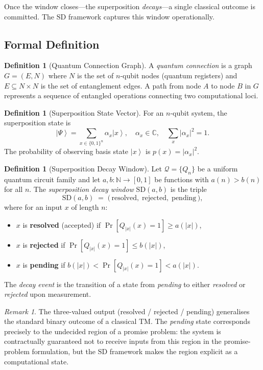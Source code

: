 \documentclass[12pt, a4paper]{article}
\theoremstyle{plain}
\theoremstyle{definition}
\newtheorem{definition}[theorem]{Definition}
\theoremstyle{remark}
\newtheorem{remark}[theorem]{Remark}
\newcommand{\ket}[1]{\left| #1 \right\rangle}
\newcommand{\SD}{\ensuremath{\mathrm{SD}}}   %
\newcommand{\QC}{\ensuremath{\mathcal{Q}}}   %
\newcommand{\Nat}{\mathbb{N}}
\newcommand{\Complex}{\mathbb{C}}
\begin{document}
Once the window closes---the superposition \emph{decays}---a single classical
outcome is committed.  The \SD{} framework captures this window operationally.

\subsection{Formal Definition}

\begin{definition}[Quantum Connection Graph]
  A \emph{quantum connection} is a graph $G = (E, N)$ where $N$ is the set
  of $n$-qubit nodes (quantum registers) and $E \subseteq N \times N$ is the
  set of entanglement edges.  A path from node $A$ to node $B$ in $G$
  represents a sequence of entangled operations connecting two computational
  loci.
\end{definition}

\begin{definition}[Superposition State Vector]
  For an $n$-qubit system, the superposition state is
  \[
    \ket{\Psi} = \sum_{x \in \{0,1\}^n} \alpha_x \ket{x},
    \quad \alpha_x \in \Complex, \quad \sum_{x} |\alpha_x|^2 = 1.
  \]
  The probability of observing basis state $\ket{x}$ is $p(x) = |\alpha_x|^2$.
\end{definition}

\begin{definition}[Superposition Decay Window]
  \label{def:sdwindow}
  Let $\QC = \{Q_n\}$ be a uniform quantum circuit family and let
  $a, b : \Nat \to [0,1]$ be functions with $a(n) > b(n)$ for all $n$.
  The \emph{superposition decay window} $\SD(a, b)$ is the triple
  \[
    \SD(a, b) \;=\; \bigl(\, \text{resolved},\; \text{rejected},\; \text{pending} \,\bigr),
  \]
  where for an input $x$ of length $n$:
  \begin{itemize}
    \item $x$ is \textbf{resolved} (accepted) if $\Pr[Q_{|x|}(x) = 1] \geq a(|x|)$,
    \item $x$ is \textbf{rejected} if $\Pr[Q_{|x|}(x) = 1] \leq b(|x|)$,
    \item $x$ is \textbf{pending} if $b(|x|) < \Pr[Q_{|x|}(x) = 1] < a(|x|)$.
  \end{itemize}
  The \emph{decay event} is the transition of a state from \emph{pending} to
  either \emph{resolved} or \emph{rejected} upon measurement.
\end{definition}

\begin{remark}
  The three-valued output (resolved / rejected / pending) generalises the
  standard binary outcome of a classical TM.  The \emph{pending} state
  corresponds precisely to the undecided region of a promise problem: the
  system is contractually guaranteed not to receive inputs from this region
  in the promise-problem formulation, but the \SD{} framework makes the
  region explicit as a computational state.
\end{remark}
\end{document}
